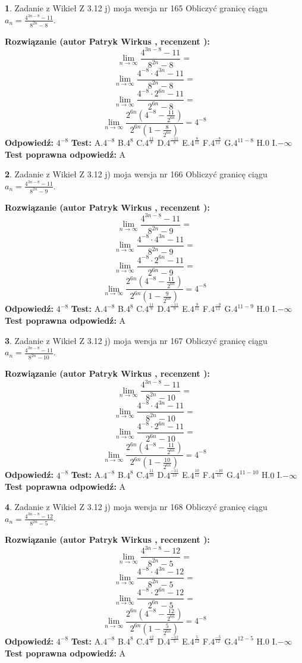 \documentclass[12pt, a4paper]{article}
\theoremstyle{definition} %
\newtheorem{zad}{}
\newcommand{\zadStart}[1]{\begin{zad}#1\newline}
\newcommand{\zadStop}{\end{zad}}
\newcommand{\rozwStart}[2]{\noindent \textbf{Rozwiązanie (autor #1 , recenzent #2): }\newline}
\newcommand{\rozwStop}{\newline}
\newcommand{\odpStart}{\noindent \textbf{Odpowiedź:}\newline}
\newcommand{\odpStop}{\newline}
\newcommand{\testStart}{\noindent \textbf{Test:}\newline}
\newcommand{\testStop}{\newline}
\newcommand{\kluczStart}{\noindent \textbf{Test poprawna odpowiedź:}\newline}
\newcommand{\kluczStop}{\newline}
\begin{document}
\zadStart{Zadanie z Wikieł Z 3.12 j) moja wersja nr 165}
Obliczyć granicę ciągu $a_{n}=\frac{4^{3n-8}-11}{8^{2n}-8}$.
\zadStop
\rozwStart{Patryk Wirkus}{}
$$\lim\limits_{n\to\infty}\frac{4^{3n-8}-11}{8^{2n}-8}=$$
$$\lim\limits_{n\to\infty}\frac{4^{-8} \cdot 4^{3n}-11}{8^{2n}-8}=$$
$$\lim\limits_{n\to\infty}\frac{4^{-8} \cdot 2^{6n}-11}{2^{6n}-8}=$$
$$\lim\limits_{n\to\infty}\frac{2^{6n}(4^{-8} - \frac{11}{2^{6n}})}{2^{6n}(1-\frac{8}{2^{6n}})}= 4^{-8}$$
\rozwStop
\odpStart
$4^{-8}$
\odpStop
\testStart
A.$4^{-8}$
B.$4^{8}$
C.$4^{\frac{11}{8}}$
D.$4^{\frac{-11}{8}}$
E.$4^{\frac{8}{11}}$
F.$4^{\frac{-8}{11}}$
G.$4^{11-8}$
H.$0$
I.$-\infty$
\testStop
\kluczStart
A
\kluczStop



\zadStart{Zadanie z Wikieł Z 3.12 j) moja wersja nr 166}
Obliczyć granicę ciągu $a_{n}=\frac{4^{3n-8}-11}{8^{2n}-9}$.
\zadStop
\rozwStart{Patryk Wirkus}{}
$$\lim\limits_{n\to\infty}\frac{4^{3n-8}-11}{8^{2n}-9}=$$
$$\lim\limits_{n\to\infty}\frac{4^{-8} \cdot 4^{3n}-11}{8^{2n}-9}=$$
$$\lim\limits_{n\to\infty}\frac{4^{-8} \cdot 2^{6n}-11}{2^{6n}-9}=$$
$$\lim\limits_{n\to\infty}\frac{2^{6n}(4^{-8} - \frac{11}{2^{6n}})}{2^{6n}(1-\frac{9}{2^{6n}})}= 4^{-8}$$
\rozwStop
\odpStart
$4^{-8}$
\odpStop
\testStart
A.$4^{-8}$
B.$4^{8}$
C.$4^{\frac{11}{9}}$
D.$4^{\frac{-11}{9}}$
E.$4^{\frac{9}{11}}$
F.$4^{\frac{-9}{11}}$
G.$4^{11-9}$
H.$0$
I.$-\infty$
\testStop
\kluczStart
A
\kluczStop



\zadStart{Zadanie z Wikieł Z 3.12 j) moja wersja nr 167}
Obliczyć granicę ciągu $a_{n}=\frac{4^{3n-8}-11}{8^{2n}-10}$.
\zadStop
\rozwStart{Patryk Wirkus}{}
$$\lim\limits_{n\to\infty}\frac{4^{3n-8}-11}{8^{2n}-10}=$$
$$\lim\limits_{n\to\infty}\frac{4^{-8} \cdot 4^{3n}-11}{8^{2n}-10}=$$
$$\lim\limits_{n\to\infty}\frac{4^{-8} \cdot 2^{6n}-11}{2^{6n}-10}=$$
$$\lim\limits_{n\to\infty}\frac{2^{6n}(4^{-8} - \frac{11}{2^{6n}})}{2^{6n}(1-\frac{10}{2^{6n}})}= 4^{-8}$$
\rozwStop
\odpStart
$4^{-8}$
\odpStop
\testStart
A.$4^{-8}$
B.$4^{8}$
C.$4^{\frac{11}{10}}$
D.$4^{\frac{-11}{10}}$
E.$4^{\frac{10}{11}}$
F.$4^{\frac{-10}{11}}$
G.$4^{11-10}$
H.$0$
I.$-\infty$
\testStop
\kluczStart
A
\kluczStop



\zadStart{Zadanie z Wikieł Z 3.12 j) moja wersja nr 168}
Obliczyć granicę ciągu $a_{n}=\frac{4^{3n-8}-12}{8^{2n}-5}$.
\zadStop
\rozwStart{Patryk Wirkus}{}
$$\lim\limits_{n\to\infty}\frac{4^{3n-8}-12}{8^{2n}-5}=$$
$$\lim\limits_{n\to\infty}\frac{4^{-8} \cdot 4^{3n}-12}{8^{2n}-5}=$$
$$\lim\limits_{n\to\infty}\frac{4^{-8} \cdot 2^{6n}-12}{2^{6n}-5}=$$
$$\lim\limits_{n\to\infty}\frac{2^{6n}(4^{-8} - \frac{12}{2^{6n}})}{2^{6n}(1-\frac{5}{2^{6n}})}= 4^{-8}$$
\rozwStop
\odpStart
$4^{-8}$
\odpStop
\testStart
A.$4^{-8}$
B.$4^{8}$
C.$4^{\frac{12}{5}}$
D.$4^{\frac{-12}{5}}$
E.$4^{\frac{5}{12}}$
F.$4^{\frac{-5}{12}}$
G.$4^{12-5}$
H.$0$
I.$-\infty$
\testStop
\kluczStart
A
\kluczStop
\end{document}
